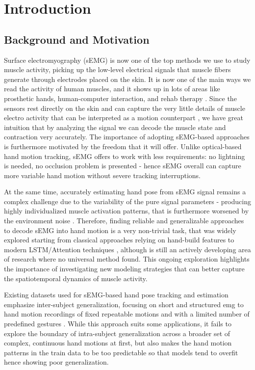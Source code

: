 \chapter{Introduction}
\label{chap:intro}

\section{Background and Motivation}

Surface electromyography (sEMG) is now one of the top methods we use to study muscle activity, picking up the low-level electrical signals that muscle fibers generate through electrodes placed on the skin. It is now one of the main ways we read the activity of human muscles, and it shows up in lots of areas like prosthetic hands, human-computer interaction, and rehab therapy \cite{zheng2022surface, simao2019review}. Since the sensors rest directly on the skin and can capture the very little details of muscle electro activity that can be interpreted as a motion counterpart \cite{petersen2018comprehensive}, we have great intuition that by analyzing the signal we can decode the muscle state and contraction very accurately. The importance of adopting sEMG-based approaches is furthermore motivated by the freedom that it will offer. Unlike optical-based hand motion tracking, sEMG offers to work with less requirements: no lightning is needed, no occlusion problem is presented - hence sEMG overall can capture more variable hand motion without severe tracking interruptions.

At the same time, accurately estimating hand pose from sEMG signal remains a complex challenge due to the variability of the pure signal parameters - producing highly individualized muscle activation patterns, that is furthermore worsened by the environment noise \cite{farago2022review, zia2018multiday}. Therefore, finding reliable and generalizable approaches to decode sEMG into hand motion is a very non-trivial task, that was widely explored starting from classical approaches relying on hand-build features to modern LSTM/Attention techniques \cite{karthick2018surface, mukhopadhyay2020experimental, zhang2023lstm}, although is still an actively developing area of research where no universal method found. This ongoing exploration highlights the importance of investigating new modeling strategies that can better capture the spatiotemporal dynamics of muscle activity.

Existing datasets used for sEMG-based hand pose tracking and estimation emphasize inter-subject generalization, focusing on short and structured emg to hand motion recordings of fixed repeatable motions and with a limited number of predefined gestures \cite{salter2024emg2pose}. While this approach suits some applications, it fails to explore the boundary of intra-subject generalization across a broader set of complex, continuous hand motions at first, but also makes the hand motion patterns in the train data to be too predictable so that models tend to overfit hence showing poor generalization.


